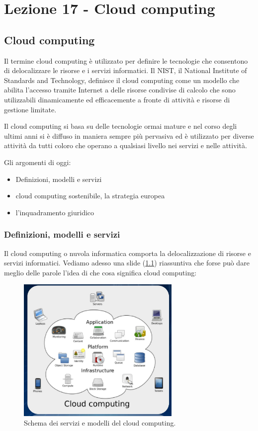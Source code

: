 \chapter{Lezione 17 - Cloud computing}

\section{Cloud computing}
Il termine cloud computing è utilizzato per definire le tecnologie che consentono di delocalizzare le risorse e i servizi informatici. Il NIST, il National Institute of Standards and Technology, definisce il cloud computing come un modello che abilita l'accesso tramite Internet a delle risorse condivise di calcolo che sono utilizzabili dinamicamente ed efficacemente a fronte di attività e risorse di gestione limitate. 

Il cloud computing si basa su delle tecnologie ormai mature e nel corso degli ultimi anni si è diffuso in maniera sempre più pervasiva ed è utilizzato per diverse attività da tutti coloro che operano a qualsiasi livello nei servizi e nelle attività. 

Gli argomenti di oggi:

\begin{itemize}
    \item Definizioni, modelli e servizi
    \item cloud computing sostenibile, la strategia europea
    \item l'inquadramento giuridico
\end{itemize}

\subsection{Definizioni, modelli e servizi}

Il cloud computing o nuvola informatica comporta la delocalizzazione di risorse e servizi informatici. 
Vediamo adesso una slide (\ref{fig:cloud-computing}) riassuntiva che forse può dare meglio delle parole l'idea di che cosa significa cloud computing:

\begin{figure}[ht!]
    \centering
    \includegraphics[width=0.7\textwidth]{images/17_lez_fig_01.jpg}
    \caption{Schema dei servizi e modelli del cloud computing.}
    \label{fig:cloud-computing}
\end{figure}


